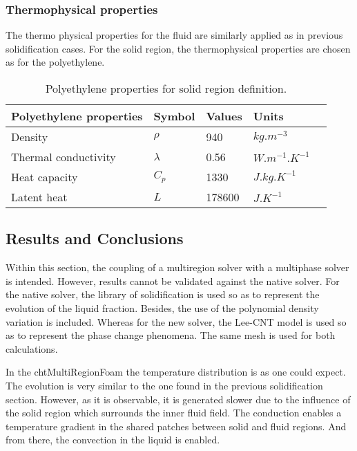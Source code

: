 \subsubsection{Thermophysical properties}

\setlength{\parindent}{0.5cm} The thermo	physical properties for the fluid are similarly applied as in previous solidification cases.
For the solid region, the thermophysical properties are chosen as for the polyethylene.

\begin{table}[h!]
	\begin{tabular}{@{}lllll@{}}
		\toprule[1pt]
		\textbf{Polyethylene properties} & \textbf{Symbol} & \textbf{Values} & \textbf{Units} &  \\ \midrule[2pt]
		Density & $\rho$ & 940 & $kg.m^{-3}$ \\	
		Thermal conductivity & $\lambda$ & 0.56 & $W.m^{-1}.K^{-1}$ \\		
		Heat capacity & $C_{p}$ & 1330 & $J.kg.K^{-1}$ \\		 
		Latent heat & $L$ &  178600  & $J.K^{-1}$ \\		 \bottomrule[1pt]		
	\end{tabular}
	\centering
	\caption{Polyethylene properties for solid region definition.}	
	\label{4.3tab}
\end{table}
\clearpage
\subsection{Results and Conclusions}
Within this section, the coupling of a multiregion solver with a multiphase solver is intended. However, results cannot be validated against the native solver.
For the native solver, the library of solidification is used so as to represent the evolution of the liquid fraction. Besides, the use of the polynomial density variation is included. Whereas for the new solver, the Lee-CNT model is used so as to represent the phase change phenomena. The same mesh is used for both calculations. 

\noindent In the chtMultiRegionFoam the temperature distribution is as one could expect. The evolution is very similar to the one found in the previous solidification section. However, as it is observable, it is generated slower due to the influence of the solid region which surrounds the inner fluid field. The conduction enables a temperature gradient in the shared patches between solid and fluid regions. And from there, the convection in the liquid is enabled. 

